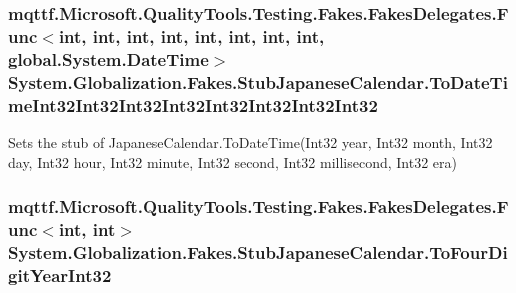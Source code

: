 \hypertarget{class_system_1_1_globalization_1_1_fakes_1_1_stub_japanese_calendar_afe3d0f416991b0c3808fbe55f09c4205}{
\subsubsection[{To\-Date\-Time\-Int32\-Int32\-Int32\-Int32\-Int32\-Int32\-Int32\-Int32}]{\setlength{\rightskip}{0pt plus 5cm}mqttf.\-Microsoft.\-Quality\-Tools.\-Testing.\-Fakes.\-Fakes\-Delegates.\-Func$<$int, int, int, int, int, int, int, int, global.\-System.\-Date\-Time$>$ System.\-Globalization.\-Fakes.\-Stub\-Japanese\-Calendar.\-To\-Date\-Time\-Int32\-Int32\-Int32\-Int32\-Int32\-Int32\-Int32\-Int32}}\label{class_system_1_1_globalization_1_1_fakes_1_1_stub_japanese_calendar_afe3d0f416991b0c3808fbe55f09c4205}


Sets the stub of Japanese\-Calendar.\-To\-Date\-Time(\-Int32 year, Int32 month, Int32 day, Int32 hour, Int32 minute, Int32 second, Int32 millisecond, Int32 era)

\hypertarget{class_system_1_1_globalization_1_1_fakes_1_1_stub_japanese_calendar_a7fd71baeba7fafe30850ad03e4faadca}{
\subsubsection[{To\-Four\-Digit\-Year\-Int32}]{\setlength{\rightskip}{0pt plus 5cm}mqttf.\-Microsoft.\-Quality\-Tools.\-Testing.\-Fakes.\-Fakes\-Delegates.\-Func$<$int, int$>$ System.\-Globalization.\-Fakes.\-Stub\-Japanese\-Calendar.\-To\-Four\-Digit\-Year\-Int32}}\label{class_system_1_1_globalization_1_1_fakes_1_1_stub_japanese_calendar_a7fd71baeba7fafe30850ad03e4faadca}


